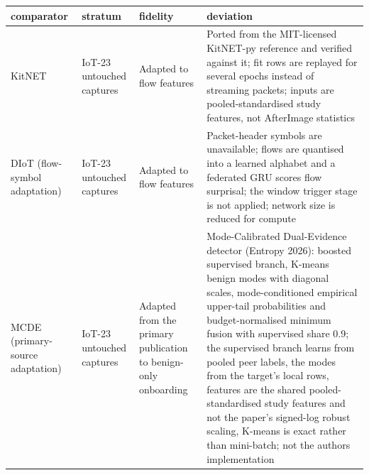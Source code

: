 \begin{tabular}{llll}
\toprule
comparator & stratum & fidelity & deviation \\
\midrule
KitNET & IoT-23 untouched captures & Adapted to flow features & Ported from the MIT-licensed KitNET-py reference and verified against it; fit rows are replayed for several epochs instead of streaming packets; inputs are pooled-standardised study features, not AfterImage statistics \\
DIoT (flow-symbol adaptation) & IoT-23 untouched captures & Adapted to flow features & Packet-header symbols are unavailable; flows are quantised into a learned alphabet and a federated GRU scores flow surprisal; the window trigger stage is not applied; network size is reduced for compute \\
MCDE (primary-source adaptation) & IoT-23 untouched captures & Adapted from the primary publication to benign-only onboarding & Mode-Calibrated Dual-Evidence detector (Entropy 2026): boosted supervised branch, K-means benign modes with diagonal scales, mode-conditioned empirical upper-tail probabilities and budget-normalised minimum fusion with supervised share 0.9; the supervised branch learns from pooled peer labels, the modes from the target's local rows, features are the shared pooled-standardised study features and not the paper's signed-log robust scaling, K-means is exact rather than mini-batch; not the authors implementation \\
\bottomrule
\end{tabular}
